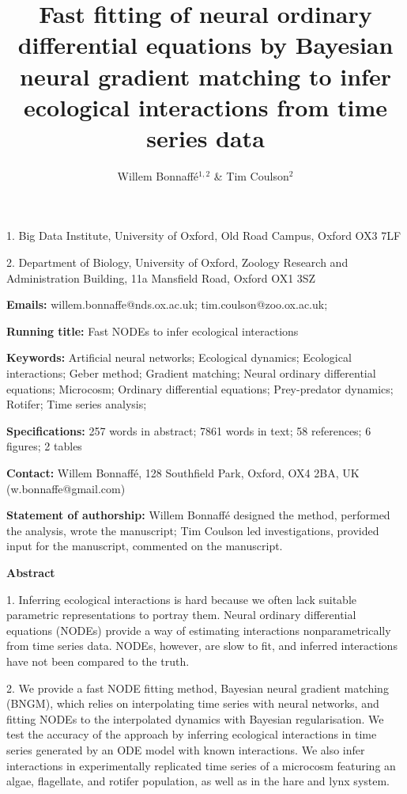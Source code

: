 \documentclass[11pt, oneside]{article}
\title{Fast fitting of neural ordinary differential equations by Bayesian neural gradient matching to infer ecological interactions from time series data}
\author{Willem Bonnaff\'e$^{1,2}$ \& Tim Coulson$^2$}
\date{}
\begin{document}
\maketitle
{}

1. Big Data Institute, University of Oxford, Old Road Campus, Oxford OX3 7LF 

2. Department of Biology, University of Oxford, Zoology Research and Administration Building, 11a Mansfield Road, Oxford OX1 3SZ 

\textbf{Emails:}
willem.bonnaffe@nds.ox.ac.uk;
tim.coulson@zoo.ox.ac.uk;

\textbf{Running title:}
Fast NODEs to infer ecological interactions

\textbf{Keywords:}
Artificial neural networks;
Ecological dynamics;  
Ecological interactions;
Geber method; 
Gradient matching;
Neural ordinary differential equations; 
Microcosm;
Ordinary differential equations; 
Prey-predator dynamics; 
Rotifer;
Time series analysis;

\textbf{Specifications:}  257 words in abstract; 7861 words in text; 58 references; 6 figures; 2 tables

\textbf{Contact:}
Willem Bonnaff\'e, 128 Southfield Park, Oxford, OX4 2BA, UK (w.bonnaffe@gmail.com)

\textbf{Statement of authorship:}
Willem Bonnaff\'e designed the method, performed the analysis, wrote the manuscript; 
Tim Coulson led investigations, provided input for the manuscript, commented on the manuscript.

\newpage
{}

\textbf{Abstract} 

1. Inferring ecological interactions is hard because we often lack suitable parametric representations to portray them.
Neural ordinary differential equations (NODEs) provide a way of estimating interactions nonparametrically from time series data. %
NODEs, however, are slow to fit, and inferred interactions have not been compared to the truth.

2. We provide a fast NODE fitting method, Bayesian neural gradient matching (BNGM), which relies on interpolating time series with neural networks, and fitting NODEs to the interpolated dynamics with Bayesian regularisation.
We test the accuracy of the approach by inferring ecological interactions in time series generated by an ODE model with known interactions. 
We also infer interactions in experimentally replicated time series of a microcosm featuring an algae, flagellate, and rotifer population, as well as in the hare and lynx system.
\end{document}
